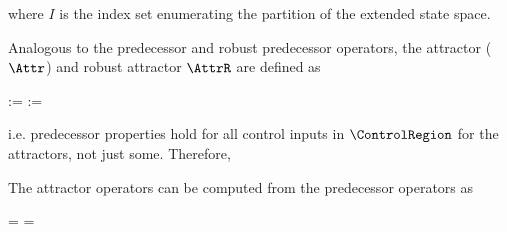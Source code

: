     where $I$ is the index set enumerating the partition of the extended state space.

\stopsection


\startsubsection[title={Attractors}]

    Analogous to the predecessor and robust predecessor operators, the attractor ($\Attr$) and robust attractor $\AttrR$ are defined as

    \startformula
        \startalign[n=2,align={right,left}]
            \NC {} :=
            \NC {} \EndAnd
            \NR
            \NC {} :=
            \NC {} \EndComma
            \NR
        \stopalign
    \stopformula

    i.e. predecessor properties hold for all control inputs in $\ControlRegion$ for the attractors, not just some.
    Therefore,

    \startformula
        \startalign[n=2,align={right,left}]
            \NC {} \subseteq
            \NC {} \EndComma
            \NR
            \NC {} \subseteq
            \NC {} \EndAnd
            \NR
            \NC {} \subseteq
            \NC {} \EndPeriod
            \NR
        \stopalign
    \stopformula

    The attractor operators can be computed from the predecessor operators as

    \startformula
        \startalign[n=2,align={right,left}]
            \NC {} =
            \NC \StateRegion \setminus {} \EndComma
            \NR
            \NC {} =
            \NC \StateRegion \setminus {} \EndPeriod
            \NR
        \stopalign
    \stopformula

